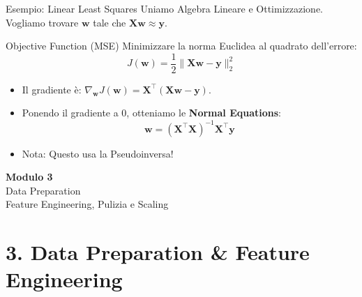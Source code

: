\documentclass[aspectratio=169, 10pt]{beamer}
\begin{document}
\begin{frame}{Esempio: Linear Least Squares}
    Uniamo Algebra Lineare e Ottimizzazione.
    Vogliamo trovare $\mathbf{w}$ tale che $\mathbf{X}\mathbf{w} \approx \mathbf{y}$.
    
    \begin{block}{Objective Function (MSE)}
        Minimizzare la norma Euclidea al quadrato dell'errore:
        \[ J(\mathbf{w}) = \frac{1}{2} \| \mathbf{X}\mathbf{w} - \mathbf{y} \|_2^2 \]
    \end{block}
    
    \begin{itemize}
        \item Il gradiente è: $\nabla_\mathbf{w} J(\mathbf{w}) = \mathbf{X}^\top (\mathbf{X}\mathbf{w} - \mathbf{y})$.
        \item Ponendo il gradiente a 0, otteniamo le \textbf{Normal Equations}:
        \[ \mathbf{w} = (\mathbf{X}^\top \mathbf{X})^{-1} \mathbf{X}^\top \mathbf{y} \]
        \item Nota: Questo usa la Pseudoinversa!
    \end{itemize}
\end{frame}


\begin{frame}[plain]
    \centering
    \vspace{2cm}
    {\Huge \textbf{Modulo 3}}\\[0.5cm]
    {\Huge \textcolor{Accent}{Data Preparation}}\\[1cm]
    {\large Feature Engineering, Pulizia e Scaling}
\end{frame}

\section{3. Data Preparation \& Feature Engineering}
\end{document}
